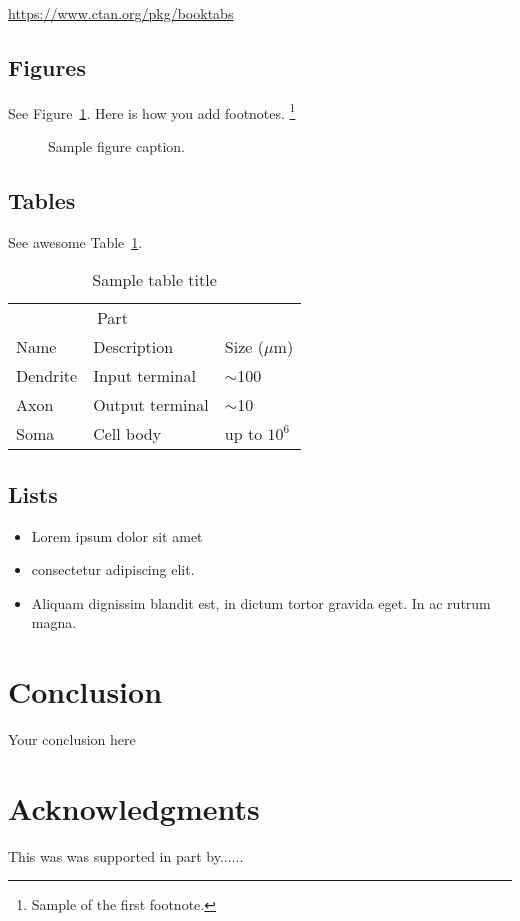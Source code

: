 \documentclass{article}
\begin{document}
    \begin{center}
        \url{https://www.ctan.org/pkg/booktabs}
    \end{center}

    \subsection{Figures}
    \lipsum[10]
    See Figure~\ref{fig:fig1}.
    Here is how you add footnotes. \footnote{Sample of the first footnote.}
    \lipsum[11]

    \begin{figure}
        \centering
        \fbox{\rule[-.5cm]{4cm}{4cm} \rule[-.5cm]{4cm}{0cm}}
        \caption{Sample figure caption.}
        \label{fig:fig1}
    \end{figure}

    \subsection{Tables}
    \lipsum[12]
    See awesome Table~\ref{tab:table}.

    \begin{table}
        \caption{Sample table title}
        \centering
        \begin{tabular}{lll}
            \toprule
            \multicolumn{2}{c}{Part} \\
            \cmidrule(r){1-2}
            Name     & Description     & Size ($\mu$m) \\
            \midrule
            Dendrite & Input terminal  & $\sim$100     \\
            Axon     & Output terminal & $\sim$10      \\
            Soma     & Cell body       & up to $10^6$  \\
            \bottomrule
        \end{tabular}
        \label{tab:table}
    \end{table}

    \subsection{Lists}
    \begin{itemize}
        \item Lorem ipsum dolor sit amet
        \item consectetur adipiscing elit.
        \item Aliquam dignissim blandit est, in dictum tortor gravida eget.
        In ac rutrum magna.
    \end{itemize}


    \section{Conclusion}
    Your conclusion here

    \section*{Acknowledgments}
    This was was supported in part by......

    
    
\end{document}
